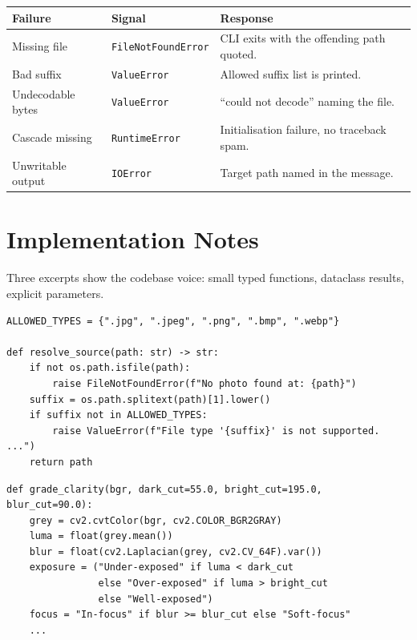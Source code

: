 \documentclass[11pt,a4paper]{article}
\begin{document}
\begin{center}
\small
\begin{tabularx}{\textwidth}{p{3.4cm}p{4.2cm}X}
\toprule
\textbf{Failure} & \textbf{Signal} & \textbf{Response} \\
\midrule
Missing file & \texttt{FileNotFoundError} & CLI exits with the offending path quoted. \\
Bad suffix & \texttt{ValueError} & Allowed suffix list is printed. \\
Undecodable bytes & \texttt{ValueError} & ``could not decode'' naming the file. \\
Cascade missing & \texttt{RuntimeError} & Initialisation failure, no traceback spam. \\
Unwritable output & \texttt{IOError} & Target path named in the message. \\
\bottomrule
\end{tabularx}
\end{center}

\section{Implementation Notes}
Three excerpts show the codebase voice: small typed functions, dataclass
results, explicit parameters.

\begin{lstlisting}[caption={Guarded intake in io\_handler.py}]
ALLOWED_TYPES = {".jpg", ".jpeg", ".png", ".bmp", ".webp"}

def resolve_source(path: str) -> str:
    if not os.path.isfile(path):
        raise FileNotFoundError(f"No photo found at: {path}")
    suffix = os.path.splitext(path)[1].lower()
    if suffix not in ALLOWED_TYPES:
        raise ValueError(f"File type '{suffix}' is not supported. ...")
    return path
\end{lstlisting}

\begin{lstlisting}[caption={Exposure and focus grading in clarity.py}]
def grade_clarity(bgr, dark_cut=55.0, bright_cut=195.0, blur_cut=90.0):
    grey = cv2.cvtColor(bgr, cv2.COLOR_BGR2GRAY)
    luma = float(grey.mean())
    blur = float(cv2.Laplacian(grey, cv2.CV_64F).var())
    exposure = ("Under-exposed" if luma < dark_cut
                else "Over-exposed" if luma > bright_cut
                else "Well-exposed")
    focus = "In-focus" if blur >= blur_cut else "Soft-focus"
    ...
\end{lstlisting}
\end{document}

